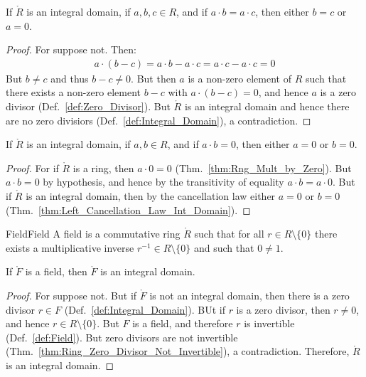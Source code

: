 \documentclass{article}                                                        %
\begin{document}
        \begin{theorem}
            \label{thm:Left_Cancellation_Law_Int_Domain}%
            If $\ring{R}$ is an integral domain, if $a,b,c\in{R}$, and if
            $a\cdot{b}=a\cdot{c}$, then either $b=c$ or $a=0$.
        \end{theorem}
        \begin{proof}
            For suppose not. Then:
            \begin{align}
                a\cdot(b-c)=a\cdot{b}-a\cdot{c}=a\cdot{c}-a\cdot{c}=0
            \end{align}
            But $b\ne{c}$ and thus $b-c\ne{0}$. But then $a$ is a non-zero
            element of $R$ such that there exists a non-zero element $b-c$ with
            $a\cdot(b-c)=0$, and hence $a$ is a zero divisor
            (Def.~\ref{def:Zero_Divisor}). But $\ring{R}$ is an integral domain
            and hence there are no zero divisiors
            (Def.~\ref{def:Integral_Domain}), a contradiction.
        \end{proof}
        \begin{theorem}
            \label{thm:Int_Domain_AB_EQ_Zero_A_or_B_EQ_Zero}%
            If $\ring{R}$ is an integral domain, if $a,b\in{R}$, and if
            $a\cdot{b}=0$, then either $a=0$ or $b=0$.
        \end{theorem}
        \begin{proof}
            For if $\ring{R}$ is a ring, then $a\cdot{0}=0$
            (Thm.~\ref{thm:Rng_Mult_by_Zero}). But $a\cdot{b}=0$ by hypothesis,
            and hence by the transitivity of equality $a\cdot{b}=a\cdot{0}$.
            But if $\ring{R}$ is an integral domain, then by the cancellation
            law either $a=0$ or $b=0$
            (Thm.~\ref{thm:Left_Cancellation_Law_Int_Domain}).
        \end{proof}
        \begin{fdefinition}{Field}{Field}
            A field is a commutative ring $\ring{R}$ such that for all
            $r\in{R}\setminus\{0\}$ there exists a multiplicative inverse
            $r^{\minus{1}}\in{R}\setminus\{0\}$ and such that $0\ne{1}$.
        \end{fdefinition}
        \begin{theorem}
            \label{thm:Fields_are_Int_Domains}%
            If $\ring{F}$ is a field, then $\ring{F}$ is an integral domain.
        \end{theorem}
        \begin{proof}
            For suppose not. But if $\ring{F}$ is not an integral domain,
            then there is a zero divisor $r\in{F}$
            (Def.~\ref{def:Integral_Domain}). BUt if $r$ is a zero divisor, then
            $r\ne{0}$, and hence $r\in{R}\setminus\{0\}$. But $F$ is a field,
            and therefore $r$ is invertible (Def.~\ref{def:Field}). But
            zero divisors are not invertible
            (Thm.~\ref{thm:Ring_Zero_Divisor_Not_Invertible}), a contradiction.
            Therefore, $\ring{R}$ is an integral domain.
        \end{proof}
\end{document}
